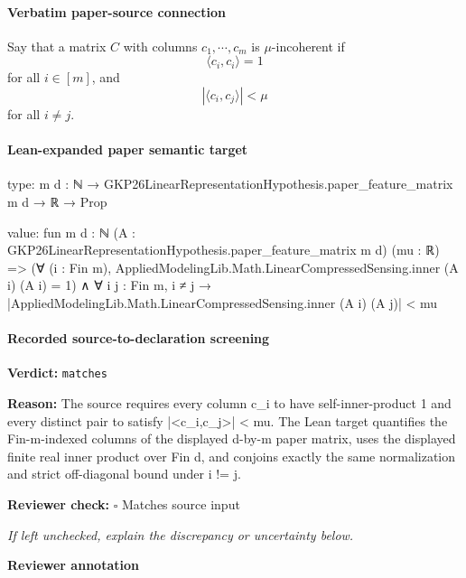 \documentclass[10pt]{article}
\newcommand{\reviewerbox}{%
  \par\noindent\fbox{\parbox{0.96\linewidth}{\rule{0pt}{0.38in}}}\par
}
\newcommand{\reviewmatch}[1]{%
  \par\noindent\textbf{Reviewer check:} $\square$\; #1\par
  \noindent\emph{If left unchecked, explain the discrepancy or uncertainty below.}\par
}
\begin{document}
\paragraph{Verbatim paper-source connection}
\begin{ReviewVerbatim}
\begin{definition}[$\mu$-incoherence]
    Say that a matrix $C$ with columns $c_1,\cdots,c_m$ is $\mu$-incoherent if
    \begin{equation}
        \langle c_i, c_i\rangle = 1
    \end{equation}
    for all $i\in [m]$, and
    \begin{equation}
        |\langle c_i, c_j\rangle| < \mu
    \end{equation}
    for all $i\neq j$.
\end{definition}
\end{ReviewVerbatim}



\paragraph{Lean-expanded paper semantic target}
\begin{ReviewVerbatim}
type:
{m d : ℕ} → GKP26LinearRepresentationHypothesis.paper_feature_matrix m d → ℝ → Prop

value:
fun {m d : ℕ} (A : GKP26LinearRepresentationHypothesis.paper_feature_matrix m d) (mu : ℝ) =>
  (∀ (i : Fin m), AppliedModelingLib.Math.LinearCompressedSensing.inner (A i) (A i) = 1) ∧
    ∀ {{i j : Fin m}}, i ≠ j → |AppliedModelingLib.Math.LinearCompressedSensing.inner (A i) (A j)| < mu
\end{ReviewVerbatim}

\paragraph{Recorded source-to-declaration screening}
\textbf{Verdict:} \texttt{matches}
\\
{\raggedright
\textbf{Reason:} The source requires every column c\_\allowbreak{}i to have self-\allowbreak{}inner-\allowbreak{}product 1 and every distinct pair to satisfy |<c\_\allowbreak{}i,c\_\allowbreak{}j>| < mu.\allowbreak{} The Lean target quantifies the Fin-\allowbreak{}m-\allowbreak{}indexed columns of the displayed d-\allowbreak{}by-\allowbreak{}m paper matrix, uses the displayed finite real inner product over Fin d, and conjoins exactly the same normalization and strict off-\allowbreak{}diagonal bound under i != j.\allowbreak{}
\par}
\reviewmatch{Matches source input}
\noindent\textbf{Reviewer annotation}\par
\reviewerbox
\end{document}
